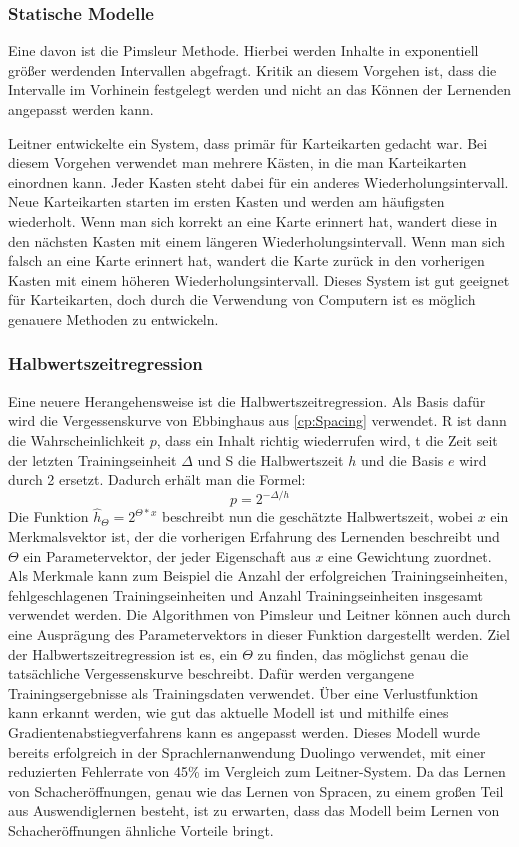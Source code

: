 \subsubsection{Statische Modelle}
Eine davon ist die Pimsleur Methode. Hierbei werden Inhalte in exponentiell größer werdenden Intervallen abgefragt. Kritik an diesem Vorgehen ist, dass die Intervalle im Vorhinein festgelegt werden und nicht an das Können der Lernenden angepasst werden kann.

Leitner \cite{leitner_so_1973} entwickelte ein System, dass primär für Karteikarten gedacht war. Bei diesem Vorgehen verwendet man mehrere Kästen, in die man Karteikarten einordnen kann. Jeder Kasten steht dabei für ein anderes Wiederholungsintervall. Neue Karteikarten starten im ersten Kasten und werden am häufigsten wiederholt. Wenn man sich korrekt an eine Karte erinnert hat, wandert diese in den nächsten Kasten mit einem längeren Wiederholungsintervall. Wenn man sich falsch an eine Karte erinnert hat, wandert die Karte zurück in den vorherigen Kasten mit einem höheren Wiederholungsintervall. Dieses System ist gut geeignet für Karteikarten, doch durch die Verwendung von Computern ist es möglich genauere Methoden zu entwickeln.

\subsubsection{Halbwertszeitregression}
Eine neuere Herangehensweise ist die Halbwertszeitregression. Als Basis dafür wird die Vergessenskurve von Ebbinghaus aus \autoref{cp:Spacing} verwendet. R ist dann die Wahrscheinlichkeit $p$, dass ein Inhalt richtig wiederrufen wird, t die Zeit seit der letzten Trainingseinheit $\Delta$ und S die Halbwertszeit $h$ und die Basis $e$ wird durch 2 ersetzt. Dadurch erhält man die Formel:
$$p = 2^{-\Delta/h}$$
Die Funktion $\hat{h}_\Theta = 2^{\Theta*x}$ beschreibt nun die geschätzte Halbwertszeit, wobei $x$ ein Merkmalsvektor ist, der die vorherigen Erfahrung des Lernenden beschreibt und $\Theta$ ein Parametervektor, der jeder Eigenschaft aus $x$ eine Gewichtung zuordnet. Als Merkmale kann zum Beispiel die Anzahl der erfolgreichen Trainingseinheiten, fehlgeschlagenen Trainingseinheiten und Anzahl Trainingseinheiten insgesamt verwendet werden. Die Algorithmen von Pimsleur und Leitner können auch durch eine Ausprägung des Parametervektors in dieser Funktion dargestellt werden. Ziel der Halbwertszeitregression ist es, ein $\Theta$ zu finden, das möglichst genau die tatsächliche Vergessenskurve beschreibt. Dafür werden vergangene Trainingsergebnisse als Trainingsdaten verwendet. Über eine Verlustfunktion kann erkannt werden, wie gut das aktuelle Modell ist und mithilfe eines Gradientenabstiegverfahrens kann es angepasst werden. Dieses Modell wurde bereits erfolgreich in der Sprachlernanwendung Duolingo verwendet, mit einer reduzierten Fehlerrate von 45\% im Vergleich zum Leitner-System. Da das Lernen von Schacheröffnungen, genau wie das Lernen von Spracen, zu einem großen Teil aus Auswendiglernen besteht, ist zu erwarten, dass das Modell beim Lernen von Schacheröffnungen ähnliche Vorteile bringt.
\cite{settles_trainable_2016}


